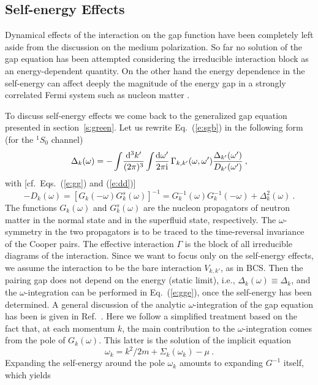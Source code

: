 \documentclass[runningheads]{svmult}
\newcommand{\be}{\begin{equation}}
\newcommand{\ee}{\end{equation}}
\def\de{\Delta}
\def\om{\omega}
\def\ss{^1\!S_0}
\begin{document}
\subsection{Self-energy Effects}
\label{s:self}

Dynamical effects of the interaction on the gap function have been completely 
left aside from the discussion on the medium polarization. 
So far no solution of the gap equation has been attempted considering the 
irreducible interaction block as an energy-dependent quantity. 
On the other hand the energy dependence
in the self-energy can affect deeply the magnitude of the energy gap in a 
strongly correlated Fermi system such as nucleon matter \cite{BOZ,BAL}.  

To discuss self-energy effects we come back to the generalized gap equation 
presented in section~\ref{s:green}. Let us rewrite Eq.~(\ref{e:sgb}) in the 
following form (for the $\ss$ channel)
\be
 \Delta_{k}(\om) = 
 -\int\!\frac{\D^3 k'}{(2\pi)^3} \int\!\frac{\D\om'}{2\pi \I} 
 \,\Gamma_{k,k'}(\om,\om')  { \de_{k'}(\om') \over D_{k'}(\om') }  \:,
\label{e:gge}
\ee
with [cf.~Eqs.~(\ref{e:gg}) and (\ref{e:dd})]
\be
 -D_{k}(\om) = \left[ G_{k}(-\om)G_{k}^{s}(\om) \right]^{-1} =
 G_{k}^{-1}(\om) G_{k}^{-1}(-\om) + \de_k^2(\om)  \:.
\label{e:GAM} 
\ee
The functions $G_{k}(\om)$ and $G_{k}^{s}(\om)$ are the nucleon 
propagators of neutron matter in the normal state and in the superfluid state, 
respectively. 
The $\omega$-symmetry in the two propagators is
to be traced to the time-reversal invariance of the Cooper pairs.
The effective interaction $\Gamma$ is the block of all irreducible diagrams 
of the interaction.
Since we want to focus only on the self-energy effects, we assume the    
interaction to be the bare interaction $V_{k,k'}$, as in BCS.
Then the pairing gap does not depend on the energy (static limit), i.e., 
$\de_k(\om)\equiv \de_k$, and the $\om$-integration can be performed 
in Eq.~(\ref{e:gge}), once the self-energy has been determined. 
A general discussion of the analytic $\omega$-integration of the gap equation 
has been is given in Ref.~\cite{BAL}. 
Here we follow a simplified treatment 
based on the fact that, at each momentum $k$, the main contribution to
the $\omega$-integration comes from the pole of $G_{k}(\om)$. 
This latter is the solution of the implicit equation
\be
 \om_k = k^2\!/2m + \Sigma_k(\om_k) - \mu  \:.
\label{e:pole}
\ee
Expanding the self-energy around the pole $\omega_k$ amounts to expanding
$G^{-1}$ itself, which yields  
\end{document}
